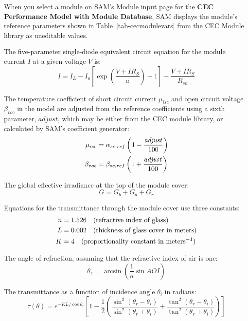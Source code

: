 \documentclass[12pt,letterpaper]{article}
\newcommand\AOI{\ensuremath{\mathit{AOI}}}
\begin{document}
When you select a module on SAM's Module input page for the \textbf{CEC Performance Model with Module Database}, SAM displays the module's reference parameters shown in Table~\ref{tab-cecmodulevars} from the CEC Module library as uneditable values.

The five-parameter single-diode equivalent circuit equation for the module current $I$ at a given voltage $V$ is:
\begin{equation}\label{eqn-cec5par}
I = I_L - I_o \left[ \exp\left(  \frac{V+IR_S}{a} \right) -1 \right] - \frac{V + IR_S}{R_{sh}}
\end{equation}

The temperature coefficient of short circuit current $\mu_{isc}$ and open circuit voltage $\beta_{voc}$ in the model are adjusted from the reference coefficients using a sixth parameter, $\mathit{adjust}$, which may be either from the CEC module library, or calculated by SAM's coefficient generator:
\begin{align}
\mu_{isc} & = \alpha_{sc,ref} \left( 1-\frac{\mathit{adjust}}{100}\right) \notag\\
\beta_{voc} & = \beta_{oc,ref} \left( 1+\frac{\mathit{adjust}}{100}\right) 
\end{align}

The global effective irradiance at the top of the module cover:
\begin{equation}
G = G_b + G_d + G_r
\end{equation}

Equations for the transmittance through the module cover use three constants:
\begin{align}\label{eqn-coverproperties}
n & = 1.526 \quad\text{(refractive index of glass)} \notag\\
L & = 0.002 \quad\text{(thickness of glass cover in meters)} \notag\\
K &= 4 \quad\text{(proportionality constant in meters$^{-1}$)}
\end{align}

The angle of refraction, assuming that the refractive index of air is one:
\begin{equation}
\theta_r = \arcsin\left(\frac{1}{n} \sin \AOI \right)
\end{equation}

The transmittance as a function of incidence angle $\theta_i$ in radians:
\begin{equation}\label{eqn-transmittance}
\tau(\theta) = e^{-K L/\cos \theta_r} \left[1 - \frac{1}{2} \left( \frac{\sin^2(\theta_r-\theta_i)}{\sin^2(\theta_r+\theta_i)}
			+ \frac{\tan^2(\theta_r-\theta_i)}{\tan^2(\theta_r+\theta_i)} \right)\right] 
\end{equation}
\end{document}
